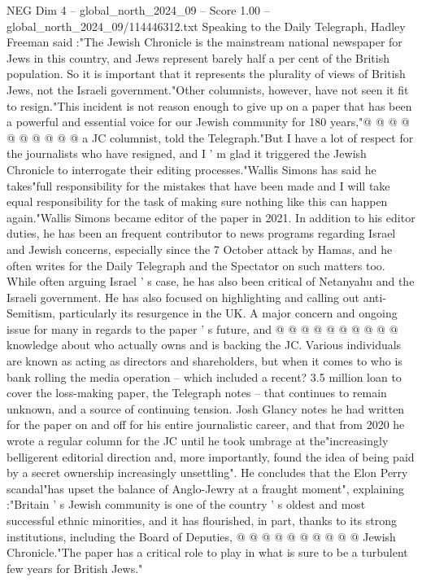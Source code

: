 \begin{textsample}{NEG Dim 4 – global\_north\_2024\_09 – Score 1.00 – global\_north\_2024\_09/114446312.txt}
Speaking to the Daily Telegraph, Hadley Freeman said :"The Jewish Chronicle is the mainstream national newspaper for Jews in this country, and Jews represent barely half a per cent of the British population.
So it is important that it represents the plurality of views of British Jews, not the Israeli government."Other columnists, however, have not seen it fit to resign."This incident is not reason enough to give up on a paper that has been a powerful and essential voice for our Jewish community for 180 years,"@ @ @ @ @ @ @ @ @ @ a JC columnist, told the Telegraph."But I have a lot of respect for the journalists who have resigned, and I ' m glad it triggered the Jewish Chronicle to interrogate their editing processes."Wallis Simons has said he takes"full responsibility for the mistakes that have been made and I will take equal responsibility for the task of making sure nothing like this can happen again."Wallis Simons became editor of the paper in 2021.
In addition to his editor duties, he has been an frequent contributor to news programs regarding Israel and Jewish concerns, especially since the 7 October attack by Hamas, and he often writes for the Daily Telegraph and the Spectator on such matters too.
While often arguing Israel ' s case, he has also been critical of Netanyahu and the Israeli government.
He has also focused on highlighting and calling out anti-Semitism, particularly its resurgence in the UK.
A major concern and ongoing issue for many in regards to the paper ' s future, and @ @ @ @ @ @ @ @ @ @ knowledge about who actually owns and is backing the JC.
Various individuals are known as acting as directors and shareholders, but when it comes to who is bank rolling the media operation -- which included a recent? 3.5 million loan to cover the loss-making paper, the Telegraph notes -- that continues to remain unknown, and a source of continuing tension.
Josh Glancy notes he had written for the paper on and off for his entire journalistic career, and that from 2020 he wrote a regular column for the JC until he took umbrage at the"increasingly belligerent editorial direction and, more importantly, found the idea of being paid by a secret ownership increasingly unsettling".
He concludes that the Elon Perry scandal"has upset the balance of Anglo-Jewry at a fraught moment", explaining :"Britain ' s Jewish community is one of the country ' s oldest and most successful ethnic minorities, and it has flourished, in part, thanks to its strong institutions, including the Board of Deputies, @ @ @ @ @ @ @ @ @ @ Jewish Chronicle."The paper has a critical role to play in what is sure to be a turbulent few years for British Jews."

\end{textsample}
